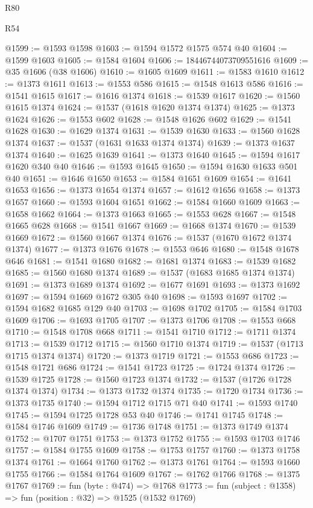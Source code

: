 \begin{lexlean}{R80}
\begin{lexlean}{R54}
\begin{coremodule}
{{{{{{{{{{{{{{{{{{{{{{{{{{{{{{{{{{{{{{{{{{{{{{{{{{@1599 := @1593 @1598
@1603 := @1594 @1572 @1575 @574 @40
@1604 := @1599 @1603
@1605 := @1584 @1604
@1606 := 18446744073709551616
@1609 := @35 @1606 (@38 @1606)
@1610 := @1605 @1609
@1611 := @1583 @1610
@1612 := @1373 @1611
@1613 := @1553 @586
@1615 := @1548 @1613 @586
@1616 := @1541 @1615
@1617 := @1616 @1374
@1618 := @1539 @1617
@1620 := @1560 @1615 @1374
@1624 := @1537 (@1618 @1620 @1374 @1374)
@1625 := @1373 @1624
@1626 := @1553 @602
@1628 := @1548 @1626 @602
@1629 := @1541 @1628
@1630 := @1629 @1374
@1631 := @1539 @1630
@1633 := @1560 @1628 @1374
@1637 := @1537 (@1631 @1633 @1374 @1374)
@1639 := @1373 @1637 @1374
@1640 := @1625 @1639
@1641 := @1373 @1640
@1645 := @1594 @1617 @1620 @340 @40
@1646 := @1593 @1645
@1650 := @1594 @1630 @1633 @501 @40
@1651 := @1646 @1650
@1653 := @1584 @1651 @1609
@1654 := @1641 @1653
@1656 := @1373 @1654 @1374
@1657 := @1612 @1656
@1658 := @1373 @1657
@1660 := @1593 @1604 @1651
@1662 := @1584 @1660 @1609
@1663 := @1658 @1662
@1664 := @1373 @1663
@1665 := @1553 @628
@1667 := @1548 @1665 @628
@1668 := @1541 @1667
@1669 := @1668 @1374
@1670 := @1539 @1669
@1672 := @1560 @1667 @1374
@1676 := @1537 (@1670 @1672 @1374 @1374)
@1677 := @1373 @1676
@1678 := @1553 @646
@1680 := @1548 @1678 @646
@1681 := @1541 @1680
@1682 := @1681 @1374
@1683 := @1539 @1682
@1685 := @1560 @1680 @1374
@1689 := @1537 (@1683 @1685 @1374 @1374)
@1691 := @1373 @1689 @1374
@1692 := @1677 @1691
@1693 := @1373 @1692
@1697 := @1594 @1669 @1672 @305 @40
@1698 := @1593 @1697
@1702 := @1594 @1682 @1685 @129 @40
@1703 := @1698 @1702
@1705 := @1584 @1703 @1609
@1706 := @1693 @1705
@1707 := @1373 @1706
@1708 := @1553 @668
@1710 := @1548 @1708 @668
@1711 := @1541 @1710
@1712 := @1711 @1374
@1713 := @1539 @1712
@1715 := @1560 @1710 @1374
@1719 := @1537 (@1713 @1715 @1374 @1374)
@1720 := @1373 @1719
@1721 := @1553 @686
@1723 := @1548 @1721 @686
@1724 := @1541 @1723
@1725 := @1724 @1374
@1726 := @1539 @1725
@1728 := @1560 @1723 @1374
@1732 := @1537 (@1726 @1728 @1374 @1374)
@1734 := @1373 @1732 @1374
@1735 := @1720 @1734
@1736 := @1373 @1735
@1740 := @1594 @1712 @1715 @71 @40
@1741 := @1593 @1740
@1745 := @1594 @1725 @1728 @53 @40
@1746 := @1741 @1745
@1748 := @1584 @1746 @1609
@1749 := @1736 @1748
@1751 := @1373 @1749 @1374
@1752 := @1707 @1751
@1753 := @1373 @1752
@1755 := @1593 @1703 @1746
@1757 := @1584 @1755 @1609
@1758 := @1753 @1757
@1760 := @1373 @1758 @1374
@1761 := @1664 @1760
@1762 := @1373 @1761
@1764 := @1593 @1660 @1755
@1766 := @1584 @1764 @1609
@1767 := @1762 @1766
@1768 := @1375 @1767
@1769 := fun (byte : @474) => @1768
@1773 := fun (subject : @1358) => fun (position : @32) => @1525 (@1532 @1769)
}}}}}}}}}}}}}}}}}}}}}}}}}}}}}}}}}}}}}}}}}}}}}}}}}}
\end{coremodule}
\end{lexlean}
\end{lexlean}
